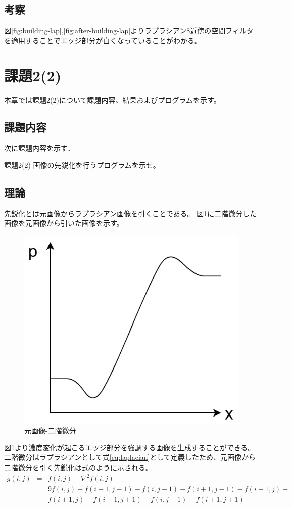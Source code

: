 \documentclass[11pt,a4paper,titlepage,dvipdfmx]{jarticle}
\begin{document}
  \subsection{考察}
    図\ref{fig:building-lap},\ref{fig:after-building-lap}よりラプラシアン8近傍の空間フィルタを適用することでエッジ部分が白くなっていることがわかる。

\section{課題2(2)}
  本章では課題2(2)について課題内容、結果およびプログラムを示す。
  \subsection{課題内容}
    次に課題内容を示す．
    \begin{itembox}[l]{課題2(2)}
      画像の先鋭化を行うプログラムを示せ。
    \end{itembox}
  \subsection{理論}
    先鋭化とは元画像からラプラシアン画像を引くことである。
    図\ref{fig:diff}に二階微分した画像を元画像から引いた画像を示す。
    \begin{figure}[H]
     \centering
     \includegraphics[scale=.7]{diff.jpg} 
     \caption{元画像-二階微分}
     \label{fig:diff}
    \end{figure}
    図\ref{fig:diff}より濃度変化が起こるエッジ部分を強調する画像を生成することができる。
    二階微分はラプラシアンとして式\ref{eq:laplacian}として定義したため、元画像から二階微分を引く先鋭化は式のように示される。
    \begin{eqnarray}\label{eq:sharp}
      g(i, j) &=& f(i ,j) - \nabla^2f(i,j) \nonumber\\
            &=& 9f(i,j) - f(i - 1, j- 1)  - f(i, j - 1) - f(i + 1, j - 1) - f(i - 1, j) -  \nonumber\\
            &&f(i + 1, j) - f(i - 1, j + 1) - f(i, j + 1) - f(i + 1, j + 1)  
    \end{eqnarray}
\end{document}
